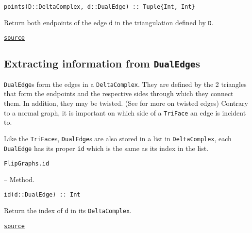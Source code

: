 \begin{adjustwidth}{2em}{0pt}


\begin{verbatim}
points(D::DeltaComplex, d::DualEdge) :: Tuple{Int, Int}
\end{verbatim}

Return both endpoints of the edge \texttt{d} in the triangulation defined by \texttt{D}.



\href{https://github.com/schto223/FlipGraphs.jl/blob/e35d43698a06b86273148826b79d585ba04fcd26/src/deltaComplex.jl#L333-L337}{\texttt{source}}


\end{adjustwidth}

\subsection{Extracting information from \texttt{DualEdge}s}



\label{5107965111902850169}{}


\texttt{DualEdge}s form the edges in a \texttt{DeltaComplex}. They are defined by the 2 triangles that form the endpoints and the respective sides through which they connect them. In addition, they may be twisted. (See  for more on twisted edges) Contrary to a normal graph, it is important on which side of a \texttt{TriFace} an edge is incident to.



Like the \texttt{TriFace}s, \texttt{DualEdge}s are also stored in a list in \texttt{DeltaComplex}, each \texttt{DualEdge} has its proper \texttt{id} which is the same as its index in the list.


\hypertarget{16105808937943859257}{\texttt{FlipGraphs.id}}  -- {Method.}

\begin{adjustwidth}{2em}{0pt}


\begin{verbatim}
id(d::DualEdge) :: Int
\end{verbatim}

Return the index of \texttt{d} in its \texttt{DeltaComplex}.



\href{https://github.com/schto223/FlipGraphs.jl/blob/e35d43698a06b86273148826b79d585ba04fcd26/src/deltaComplex.jl#L134-L138}{\texttt{source}}


\end{adjustwidth}

